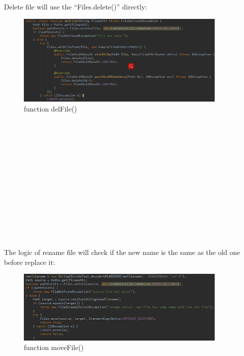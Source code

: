 \documentclass[12pt,a4]{article}
\begin{document}
Delete file will use the “Files.delete()” directly:
\begin{figure}[h]%
		\centering  %
		\includegraphics[width=4in]{figure/except3}  	%
		\caption{function delFile()}   %
		\end{figure}
\\
\\
\\
\\
\\
\\
\\
\\
\\
\\
\\
\\
\\
The logic of rename file will check if the new name is the same as the old one before replace it:
\begin{figure}[h]%
		\centering  %
		\includegraphics[width=4in]{figure/except4}  	%
		\caption{function moveFile()}   %
		\end{figure}
\end{document}
